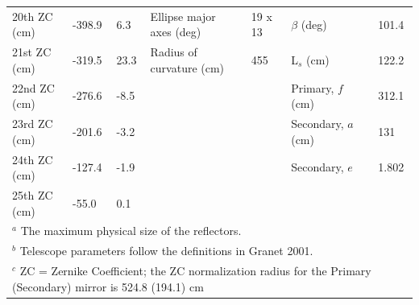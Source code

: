 \documentclass[]{spie}  %
\begin{document}
\begin{table}[ht]
{\begin{tabular}{|l|llll||ll|}
20th ZC (cm) & -398.9            & 6.3            & Ellipse major axes (deg)  & 19 x 13  & $\beta$  (deg)                 & 101.4 \\   
21st ZC (cm) & -319.5            & 23.3              & Radius of curvature (cm)  & 455      & L$_s$ (cm)                     & 122.2 \\   
22nd ZC (cm) & -276.6            & -8.5              &                           &          & Primary, $f$ (cm)              & 312.1 \\   
23rd ZC (cm) & -201.6            & -3.2            &                           &          & Secondary, $a$ (cm)            & 131   \\   
24th ZC (cm) & -127.4            & -1.9            &                           &          & Secondary, $e$                 &  1.802  \\
25th ZC (cm) & -55.0             & 0.1            &                           &          &                                &       \\ \hline
\multicolumn{7}{l}{\footnotesize  $^a$ The maximum physical size of the reflectors.}\\
\multicolumn{7}{l}{\footnotesize  $^b$ Telescope parameters follow the definitions in Granet 2001.\cite{granet2001}} \\
\multicolumn{7}{l}{\footnotesize  $^c$ ZC = Zernike Coefficient; the ZC normalization radius for the Primary (Secondary) mirror is 524.8 (194.1) cm} \\
\end{tabular}
}
\end{table}
\end{document}
